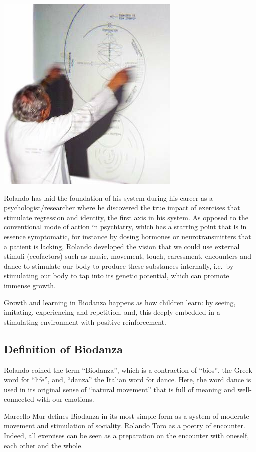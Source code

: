 \documentclass[
]{article}
\begin{document}
\includegraphics[width=0.45\linewidth]{./figs/rolandoAndModel}

Rolando has laid the foundation of his system during his career as a psychologist/researcher where he discovered the true impact of exercises that stimulate regression and identity, the first axis in his system. As opposed to the conventional mode of action in psychiatry, which has a starting point that is in essence symptomatic, for instance by dosing hormones or neurotransmitters that a patient is lacking, Rolando developed the vision that we could use external stimuli (ecofactors) such as music, movement, touch, caressment, encounters and dance to stimulate our body to produce these substances internally, i.e.~by stimulating our body to tap into its genetic potential, which can promote immense growth.

Growth and learning in Biodanza happens as how children learn: by seeing, imitating, experiencing and repetition, and, this deeply embedded in a stimulating environment with positive reinforcement.

\hypertarget{definition-of-biodanza}{%
\subsection{Definition of Biodanza}\label{definition-of-biodanza}}

Rolando coined the term ``Biodanza'', which is a contraction of ``bios'', the Greek word for ``life'', and, ``danza'' the Italian word for dance. Here, the word dance is used in its original sense of ``natural movement'' that is full of meaning and well-connected with our emotions.

Marcello Mur defines Biodanza in its most simple form as a system of moderate movement and stimulation of sociality.
Rolando Toro as a poetry of encounter. Indeed, all exercises can be seen as a preparation on the encounter with oneself, each other and the whole.
\end{document}
